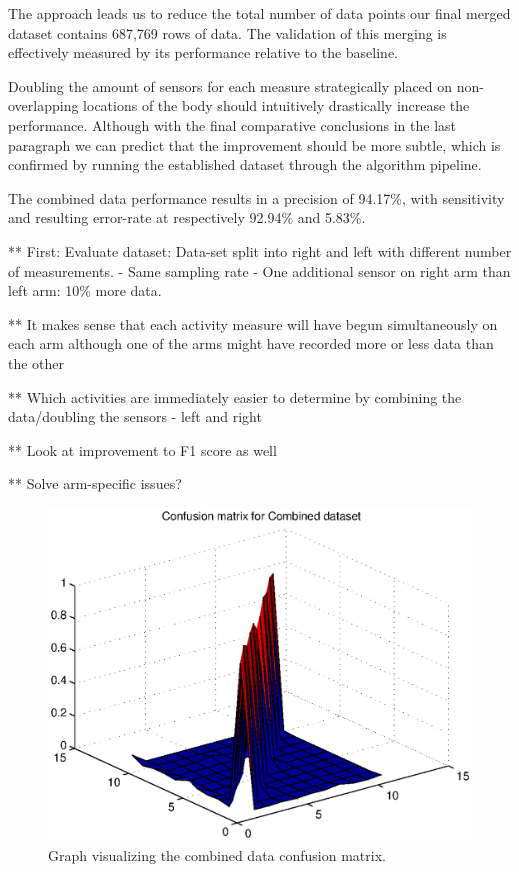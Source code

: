 \documentclass{sig-alternate}
\begin{document}
The approach leads us to reduce the total number of data points our final merged dataset contains 687,769 rows of data. The validation of this merging is effectively measured by its performance relative to the baseline.

Doubling the amount of sensors for each measure strategically placed on non-overlapping locations of the body should intuitively drastically increase the performance. Although with the final comparative conclusions in the last paragraph we can predict that the improvement should be more subtle, which is confirmed by running the established dataset through the algorithm pipeline.

The combined data performance results in a precision of 94.17\%, with sensitivity and resulting error-rate at respectively 92.94\% and 5.83\%.

 


** First: Evaluate dataset: Data-set split into right and left with different number of measurements.
- Same sampling rate
- One additional sensor on right arm than left arm: 10\% more data.

** It makes sense that each activity measure will have begun simultaneously on each arm although one of the arms might have recorded more or less data than the other

** Which activities are immediately easier to determine by combining the data/doubling the sensors - left and right

** Look at improvement to F1 score as well

** Solve arm-specific issues?

\begin{figure}[bp]
  \centering
  \includegraphics[scale=0.4]{./matlab_output/nConfkNN_both.eps}
  \caption{Graph visualizing the combined data confusion matrix.}
  \label{fig:conf_both_surf}
\end{figure}
\end{document}
